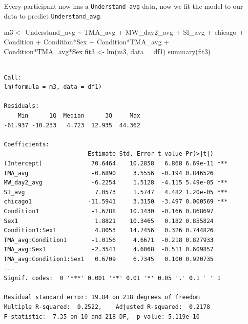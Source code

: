 \documentclass[
  letterpaper,
  DIV=11,
  numbers=noendperiod]{scrartcl}
\newenvironment{Shaded}{\begin{snugshade}}{\end{snugshade}}
\newcommand{\AttributeTok}[1]{\textcolor[rgb]{0.49,0.56,0.16}{#1}}
\newcommand{\FunctionTok}[1]{\textcolor[rgb]{0.02,0.16,0.49}{#1}}
\newcommand{\NormalTok}[1]{\textcolor[rgb]{0.00,0.44,0.13}{#1}}
\newcommand{\OtherTok}[1]{\textcolor[rgb]{0.00,0.44,0.13}{#1}}
\newcommand{\SpecialCharTok}[1]{\textcolor[rgb]{0.25,0.44,0.63}{#1}}
\begin{document}
Every participant now has a \texttt{Understand\_avg} data, now we fit
the model to our data to predict \texttt{Understand\_avg}:

\begin{Shaded}
\begin{Highlighting}[]
\NormalTok{m3 }\OtherTok{\textless{}{-}}\NormalTok{ Understand\_avg }\SpecialCharTok{\textasciitilde{}}\NormalTok{ TMA\_avg }\SpecialCharTok{+}\NormalTok{ MW\_day2\_avg }\SpecialCharTok{+}\NormalTok{ SI\_avg }\SpecialCharTok{+}\NormalTok{ chicago }\SpecialCharTok{+}\NormalTok{ Condition }\SpecialCharTok{+}\NormalTok{ Condition}\SpecialCharTok{*}\NormalTok{Sex }\SpecialCharTok{+}\NormalTok{ Condition}\SpecialCharTok{*}\NormalTok{TMA\_avg }\SpecialCharTok{+}\NormalTok{ Condition}\SpecialCharTok{*}\NormalTok{TMA\_avg}\SpecialCharTok{*}\NormalTok{Sex}
\NormalTok{fit3 }\OtherTok{\textless{}{-}} \FunctionTok{lm}\NormalTok{(m3, }\AttributeTok{data =}\NormalTok{ df1)}
\FunctionTok{summary}\NormalTok{(fit3)}
\end{Highlighting}
\end{Shaded}

\begin{verbatim}

Call:
lm(formula = m3, data = df1)

Residuals:
    Min      1Q  Median      3Q     Max 
-61.937 -10.233   4.723  12.935  44.362 

Coefficients:
                        Estimate Std. Error t value Pr(>|t|)    
(Intercept)              70.6464    10.2858   6.868 6.69e-11 ***
TMA_avg                  -0.6890     3.5556  -0.194 0.846526    
MW_day2_avg              -6.2254     1.5128  -4.115 5.49e-05 ***
SI_avg                    7.0573     1.5747   4.482 1.20e-05 ***
chicago1                -11.5941     3.3150  -3.497 0.000569 ***
Condition1               -1.6788    10.1430  -0.166 0.868697    
Sex1                      1.8821    10.3465   0.182 0.855824    
Condition1:Sex1           4.8053    14.7456   0.326 0.744826    
TMA_avg:Condition1       -1.0156     4.6671  -0.218 0.827933    
TMA_avg:Sex1             -2.3541     4.6068  -0.511 0.609857    
TMA_avg:Condition1:Sex1   0.6709     6.7345   0.100 0.920735    
---
Signif. codes:  0 '***' 0.001 '**' 0.01 '*' 0.05 '.' 0.1 ' ' 1

Residual standard error: 19.84 on 218 degrees of freedom
Multiple R-squared:  0.2522,    Adjusted R-squared:  0.2178 
F-statistic:  7.35 on 10 and 218 DF,  p-value: 5.119e-10
\end{verbatim}
\end{document}
